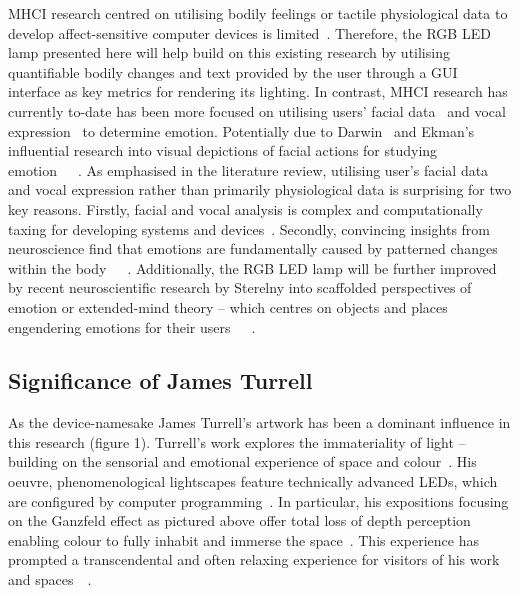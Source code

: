 \documentclass{sigchi}
\begin{document}
MHCI research centred on utilising bodily feelings or tactile physiological data to develop affect-sensitive computer devices is limited~\cite{pantic2008human}. Therefore, the RGB LED lamp presented here will help build on this existing research by utilising quantifiable bodily changes and text provided by the user through a GUI interface as key metrics for rendering its lighting. In contrast, MHCI research has currently to-date has been more focused on utilising users’ facial data~\cite{yang2015lighting} and vocal expression~\cite{davletcharova2015detection} to determine emotion. Potentially due to Darwin~\cite{hess2009darwin} and Ekman’s influential research into visual depictions of facial actions for studying emotion~\cite{ekman1992facial}~\cite{ekman2003darwin}~\cite{ekman2006darwin}. As emphasised in the literature review, utilising user’s facial data and vocal expression rather than primarily physiological data is surprising for two key reasons. Firstly, facial and vocal analysis is complex and computationally taxing for developing systems and devices~\cite{marechal2019survey}. Secondly, convincing insights from neuroscience find that emotions are fundamentally caused by patterned changes within the body~\cite{colombetti2014feeling}~\cite{james1922emotions}~\cite{laricchiuta2015embodied}. Additionally, the RGB LED lamp will be further improved by recent neuroscientific research by Sterelny into scaffolded perspectives of emotion or extended-mind theory – which centres on objects and places engendering emotions for their users~\cite{colombetti2015scaffoldings}~\cite{sterelny2010minds}~\cite{sterelny2004externalism}.


\subsection{Significance of James Turrell}

As the device-namesake James Turrell’s artwork has been a dominant influence in this research (figure 1). Turrell’s work explores the immateriality of light – building on the sensorial and emotional experience of space and colour~\cite{adcock1990james}. His oeuvre, phenomenological lightscapes feature technically advanced LEDs, which are configured by computer programming~\cite{hylton2013james}. In particular, his expositions focusing on the Ganzfeld effect as pictured above offer total loss of depth perception enabling colour to fully inhabit and immerse the space~\cite{basse2016light}. This experience has prompted a transcendental and often relaxing experience for visitors of his work and spaces~\cite{adcock1990james}~\cite{basse2016light}.
\end{document}
